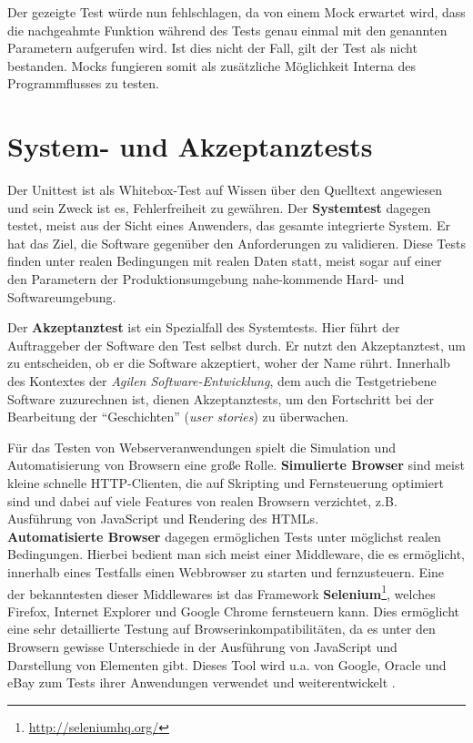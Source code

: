   Der gezeigte Test würde nun fehlschlagen, da von einem Mock erwartet wird, dass die nachgeahmte Funktion während des Tests genau einmal mit den genannten Parametern aufgerufen wird. Ist dies nicht der Fall, gilt der Test als nicht bestanden. Mocks fungieren somit als zusätzliche Möglichkeit Interna des Programmflusses zu testen.

\section{System- und Akzeptanztests}
\label{sec:acceptance}
Der Unittest ist als Whitebox-Test auf Wissen über den Quelltext angewiesen und sein Zweck ist es, Fehlerfreiheit zu gewähren. Der \textbf{Systemtest} dagegen testet, meist aus der Sicht eines Anwenders, das gesamte integrierte System. Er hat das Ziel, die Software gegenüber den Anforderungen zu validieren. Diese Tests finden unter realen Bedingungen mit realen Daten statt, meist sogar auf einer den Parametern der Produktionsumgebung nahe-kommende Hard- und Softwareumgebung.

Der \textbf{Akzeptanztest} ist ein Spezialfall des Systemtests. Hier führt der Auftraggeber der Software den Test selbst durch. Er nutzt den Akzeptanztest, um zu entscheiden, ob er die Software akzeptiert, woher der Name rührt.
Innerhalb des Kontextes der \textit{Agilen Software-Entwicklung}, dem auch die Testgetriebene Software zuzurechnen ist, dienen Akzeptanztests, um den Fortschritt bei der Bearbeitung der "`Geschichten"' (\textit{user stories}) zu überwachen.

Für das Testen von Webserveranwendungen spielt die Simulation und Automatisierung von Browsern eine große Rolle. \textbf{Simulierte Browser} sind meist kleine schnelle HTTP-Clienten, die auf Skripting und Fernsteuerung optimiert sind und dabei auf viele Features von realen Browsern verzichtet, z.B. Ausführung von JavaScript und Rendering des HTMLs. \\
\textbf{Automatisierte Browser} dagegen ermöglichen Tests unter möglichst realen Bedingungen. Hierbei bedient man sich meist einer Middleware, die es ermöglicht, innerhalb eines Testfalls einen Webbrowser zu starten und fernzusteuern. Eine der bekanntesten dieser Middlewares ist das Framework \textbf{Selenium}\footnote{\url{http://seleniumhq.org/}}, welches Firefox, Internet Explorer und Google Chrome fernsteuern kann. Dies ermöglicht eine sehr detaillierte Testung auf Browserinkompatibilitäten, da es unter den Browsern gewisse Unterschiede in der Ausführung von JavaScript und Darstellung von Elementen gibt. Dieses Tool wird u.a. von Google, Oracle und eBay zum Tests ihrer Anwendungen verwendet und weiterentwickelt \citep{selenium_hq_selenium_2010}.
